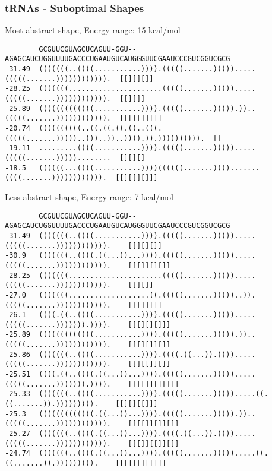\documentclass[ignorenonframetext,10pt]{beamer}
\begin{document}
\begin{frame}[fragile]
  \frametitle{tRNAs - Suboptimal Shapes}
  \tiny
  \begin{block}{\small Most abstract shape, Energy range: 15 kcal/mol}
    \begin{verbatim}
        GCGUUCGUAGCUCAGUU-GGU--AGAGCAUCUGGUUUUGACCCUGAAUGUCAUGGGUUCGAAUCCCGUCGGUCGCG
-31.49  (((((((..((((...........)))).(((((.......))))).....(((((.......)))))))))))).  [[][][]]
-28.25  (((((((......................(((((.......))))).....(((((.......)))))))))))).  [[][]]
-25.89  (((((((((((((...........)))).(((((.......))))).))..(((((.......)))))))))))).  [[[][]][]]
-20.74  ((((((((((..((.((.((.((..(((.(((((.......)))))..)))..))..)))).)).)))))))))).  []
-19.11  .........((((...........)))).(((((.......))))).....(((((.......)))))........  [][][]
-18.5   ((((((...((((...........))))((((((.......)))).......((((.......)))))))))))).  [[][[][]]]
    \end{verbatim}
  \end{block}
  \begin{block}{\small Less abstract shape, Energy range: 7 kcal/mol}
    \begin{verbatim}
        GCGUUCGUAGCUCAGUU-GGU--AGAGCAUCUGGUUUUGACCCUGAAUGUCAUGGGUUCGAAUCCCGUCGGUCGCG
-31.49  (((((((..((((...........)))).(((((.......))))).....(((((.......)))))))))))).    [[][][]]
-30.9   (((((((..((((.((...))...)))).(((((.......))))).....(((((.......)))))))))))).    [[[]][][]]
-28.25  (((((((......................(((((.......))))).....(((((.......)))))))))))).    [[][]]
-27.0   (((((((...................((.(((((.......)))))..)).(((((.......)))))))))))).    [[[]][]]
-26.1   ((((.((..((((...........)))).(((((.......))))).....(((((.......))))))).)))).    [[[][][]]]
-25.89  (((((((((((((...........)))).(((((.......))))).))..(((((.......)))))))))))).    [[[][]][]]
-25.86  (((((((..((((...........)))).((((.((...)).)))).....(((((.......)))))))))))).    [[][[]][]]
-25.51  ((((.((..((((.((...))...)))).(((((.......))))).....(((((.......))))))).)))).    [[[[]][][]]]
-25.33  (((((((..((((...........)))).(((((.......))))).....((.((.......)).))))))))).    [[][][[]]]
-25.3   (((((((((((((.((...))...)))).(((((.......))))).))..(((((.......)))))))))))).    [[[[]][]][]]
-25.27  (((((((..((((.((...))...)))).((((.((...)).)))).....(((((.......)))))))))))).    [[[]][[]][]]
-24.74  (((((((..((((.((...))...)))).(((((.......))))).....((.((.......)).))))))))).    [[[]][][[]]]
    \end{verbatim}
  \end{block}
\end{frame}
\end{document}
